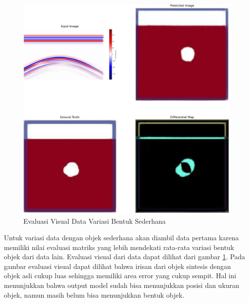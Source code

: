 \documentclass[conference]{IEEEtran}
\begin{document}
\begin{figure}[ht]
  \centering
  \includegraphics[scale=0.15]{gambar/diffMapSederhana.jpg}
  \caption{Evaluasi Visual Data Variasi Bentuk Sederhana}
  \label{fig:diffmapsederhana}
\end{figure}

Untuk variasi data dengan objek sederhana akan diambil data pertama karena memiliki nilai evaluasi matriks yang lebih mendekati rata-rata variasi bentuk objek dari data lain. 
Evaluasi visual dari data dapat dilihat dari gambar \ref{fig:diffmapsederhana}.
Pada gambar evaluasi visual dapat dilihat bahwa irisan dari objek sintesis dengan objek asli cukup luas sehingga memiliki area error yang cukup sempit. 
Hal ini menunjukkan bahwa output model sudah bisa menunjukkan posisi dan ukuran objek, namun masih belum bisa menunjukkan bentuk objek.
\end{document}
